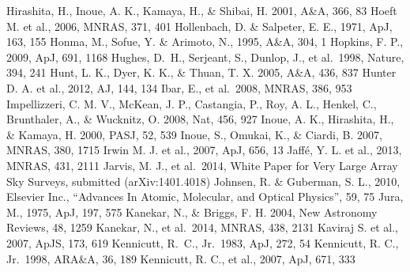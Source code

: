 \begin{thebibliography}{99}
\begin{multicols}{2}
{
    	Hirashita, H., Inoue, A. K., Kamaya, H., \& Shibai, H. 2001, A\&A, 366, 83
	Hoeft M. et al., 2006, MNRAS, 371, 401
	Hollenbach, D. \& Salpeter, E. E., 1971, ApJ, 163, 155
	Honma, M., Sofue, Y. \& Arimoto, N., 1995, A\&A, 304, 1
	Hopkins, F. P., 2009, ApJ, 691, 1168
	Hughes, D.~H., Serjeant, S., Dunlop, J., et al.\ 1998, Nature, 394, 241 
    	Hunt, L. K., Dyer, K. K., \& Thuan, T. X. 2005, A\&A, 436, 837
	Hunter D. A. et al., 2012, AJ, 144, 134
    	Ibar, E., et al.\ 2008, MNRAS, 386, 953
    	Impellizzeri, C. M. V., McKean, J. P., Castangia, P., Roy, A. L.,
   	Henkel, C.,  Brunthaler, A., \& Wucknitz, O. 2008, Nat, 456, 927
    	Inoue, A. K., Hirashita, H., \& Kamaya, H. 2000, PASJ, 52, 539
    	Inoue, S., Omukai, K., \& Ciardi, B. 2007, MNRAS, 380, 1715
	Irwin M. J. et al., 2007, ApJ, 656, 13
	Jaff{\'e}, Y. L. et al., 2013, MNRAS, 431, 2111
    	Jarvis, M. J., et al.\ 2014, White Paper for Very Large Array Sky Surveys, submitted (arXiv:1401.4018)
	Johnsen, R. \& Guberman, S. L., 2010, Elsevier Inc., 
	``Advances In Atomic, Molecular, and Optical Physics'', 59, 75
	Jura, M., 1975, ApJ, 197, 575
    	Kanekar, N., \& Briggs, F. H. 2004, New Astronomy Reviews, 48, 1259
    	Kanekar, N., et al.\ 2014, MNRAS, 438, 2131
	Kaviraj S. et al., 2007, ApJS, 173, 619
	Kennicutt, R.~C., Jr.\ 1983, ApJ, 272, 54 
    	Kennicutt, R. C., Jr.\ 1998, ARA\&A, 36, 189
	Kennicutt, R. C., et al., 2007, ApJ, 671, 333
}
\end{multicols}
\end{thebibliography}
